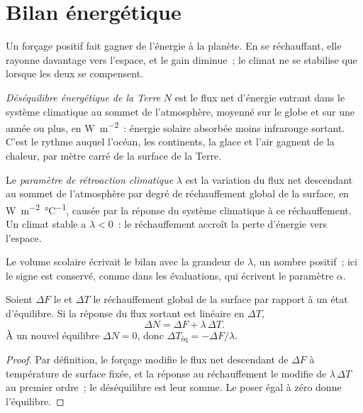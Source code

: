 \section{Bilan énergétique}\label{sec:b2:anthropogenic-climate-change:energy}

Un forçage positif fait gagner de l'énergie à la planète. En se réchauffant, elle rayonne davantage
vers l'espace, et le gain diminue~; le climat ne se stabilise que lorsque les deux se compensent.

\begin{definition}\label{def:b2:anthropogenic-climate-change:eei}
\emph{Déséquilibre énergétique de la Terre} $N$ est le flux net
d'énergie entrant dans le système climatique au sommet de l'atmosphère, moyenné sur le globe et sur une année
ou plus, en \unit{W.m^{-2}}~: énergie solaire absorbée moins infrarouge sortant. C'est le rythme auquel
l'océan, les continents, la glace et l'air gagnent de la chaleur, par mètre carré de la surface de la Terre.
\end{definition}

\begin{definition}\label{def:b2:anthropogenic-climate-change:lambda}
Le \emph{paramètre de rétroaction climatique} $\lambda$ est la
variation du flux net descendant au sommet de l'atmosphère par degré de réchauffement global de la
surface, en \unit{W.m^{-2}.\celsius^{-1}}, causée par la réponse du système climatique à ce réchauffement.
Un climat stable a $\lambda < 0$~: le réchauffement accroît la perte d'énergie vers l'espace.
\end{definition}

Le volume scolaire écrivait le bilan avec la grandeur de $\lambda$, un nombre positif~;
ici le signe est conservé, comme dans les évaluations, qui écrivent le paramètre $\alpha$.

\begin{proposition}\label{prop:b2:anthropogenic-climate-change:balance}
Soient $\Delta F$ le  et $\Delta T$ le réchauffement global de la surface
par rapport à un état d'équilibre. Si la réponse du flux sortant est linéaire en $\Delta T$,
\[
  \Delta N = \Delta F + \lambda\,\Delta T .
\]
À un nouvel équilibre $\Delta N = 0$, donc $\Delta T_{\text{éq}} = -\Delta F/\lambda$.
\end{proposition}
\begin{proof}
Par définition, le forçage modifie le flux net descendant de $\Delta F$ à température
de surface fixée, et la réponse au réchauffement le modifie de $\lambda\,\Delta T$ au
premier ordre~; le déséquilibre est leur somme. Le poser égal à zéro donne l'équilibre.
\end{proof}

